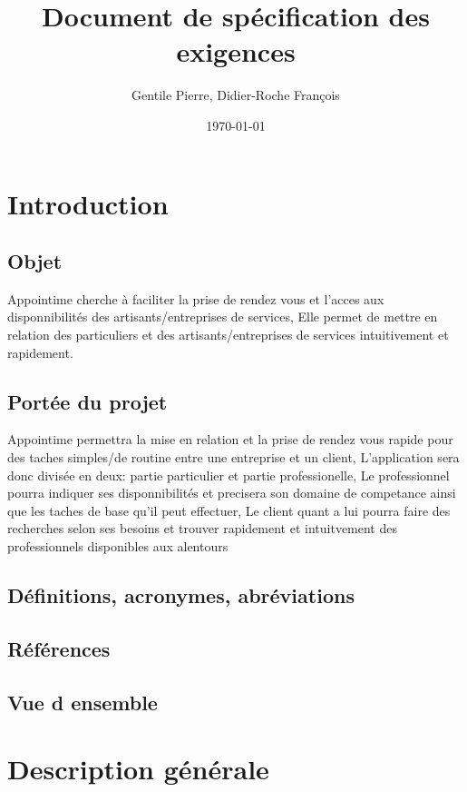 \documentclass{article}
\author{Gentile Pierre, Didier-Roche François}
\date{\today}
\title{Document de spécification des exigences}
\begin{document}
\maketitle

\newpage
\tableofcontents


\section{Introduction}
\subsection{Objet}
Appointime cherche à faciliter la prise de rendez vous et l’acces aux disponnibilités des artisants/entreprises de services,
Elle permet de mettre en relation des particuliers et des  artisants/entreprises de services intuitivement et rapidement.
\subsection{Portée du projet}
Appointime permettra la mise en relation et la prise de rendez vous rapide pour des taches simples/de routine entre une entreprise et un client,
L’application sera donc divisée en deux: partie particulier et partie professionelle, Le professionnel pourra indiquer ses disponnibilités et precisera son domaine de competance ainsi que les taches de base qu’il peut effectuer,
Le client quant a lui pourra faire des recherches selon ses besoins et trouver rapidement et intuitvement des professionnels disponibles aux alentours
\subsection{Définitions, acronymes, abréviations}

\subsection{Références}

\subsection{Vue d ensemble}


\section{Description générale}
\end{document}
